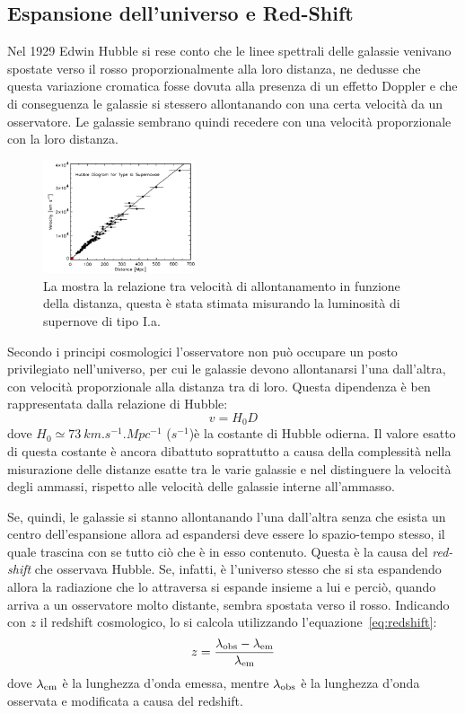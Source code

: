 \subsection{Espansione dell'universo e Red-Shift}\label{sec:espansione}

Nel 1929 Edwin Hubble si rese conto che le linee spettrali delle galassie venivano spostate verso il rosso proporzionalmente alla loro distanza, ne dedusse che questa variazione cromatica fosse dovuta alla  presenza di un effetto Doppler e che di conseguenza le galassie si stessero allontanando con una certa velocità da un osservatore. Le galassie sembrano quindi recedere con una velocità proporzionale con la loro distanza.

\begin{figure}
    \centering
    \includegraphics[width=0.4\textwidth]{immagini/redshift.png}
    \caption{La mostra la relazione tra velocità di allontanamento in funzione della distanza, questa è stata stimata misurando la luminosità di supernove di tipo I.a.}\label{fig:redshift}
\end{figure}

Secondo i principi cosmologici l'osservatore non può occupare un posto privilegiato nell'universo, per cui le galassie devono allontanarsi l'una dall'altra, con velocità proporzionale alla distanza tra di loro. Questa dipendenza è ben rappresentata dalla relazione di Hubble:
\begin{equation}\label{eq:hubble}
    v = H_0 D
\end{equation}
dove $H_0 \simeq \SI{73}{km.s^{-1}.Mpc^{-1}}$ ($s^{-1}$)è la costante di Hubble odierna. Il valore esatto di questa costante è ancora dibattuto soprattutto a causa della complessità nella misurazione delle distanze esatte tra le varie galassie e nel distinguere la velocità degli ammassi, rispetto alle velocità delle galassie interne all'ammasso.

Se, quindi, le galassie si stanno allontanando l'una dall'altra senza che esista un centro dell'espansione allora ad espandersi deve essere lo spazio-tempo stesso, il quale trascina con se tutto ciò che è in esso contenuto. Questa è la causa del \emph{red-shift} che osservava Hubble. Se, infatti, è l'universo stesso che si sta espandendo allora la radiazione che lo attraversa si espande insieme a lui e perciò, quando arriva a un osservatore molto distante, sembra spostata verso il rosso. Indicando con $z$ il redshift cosmologico, lo si calcola utilizzando l'equazione~\eqref{eq:redshift}:
\begin{equation}\label{eq:redshift}
    z = \frac{\lambda_\textup{obs} - \lambda_\textup{em}}{\lambda_\textup{em}}
\end{equation}
dove $\lambda_\textup{em}$ è la lunghezza d'onda emessa, mentre $\lambda_\textup{obs}$ è la lunghezza d'onda osservata e modificata a causa del redshift.

